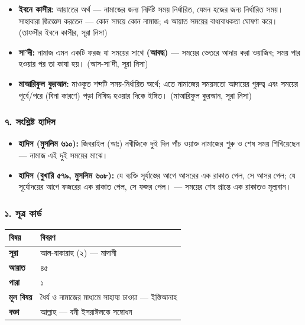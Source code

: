 \begin{itemize}
\item \textbf{ইবনে কাসীর:} আয়াতের অর্থ — নামাজের জন্য নির্দিষ্ট সময় নির্ধারিত, যেমন হজের জন্য নির্ধারিত সময়। সাহাবারা জিজ্ঞেস করতেন — কোন সময়ে কোন নামাজ; এ আয়াত সময়ের বাধ্যবাধকতা ঘোষণা করে। (তাফসীর ইবনে কাসীর, সূরা নিসা)
\item \textbf{সা'দী:} নামাজ এমন একটি ফরজ যা সময়ের সাথে \textbf{ (আবদ্ধ)} — সময়ের ভেতরে আদায় করা ওয়াজিব; সময় পার হওয়ার পর তা কাযা হয়। (আস-সা'দী, সূরা নিসা)
\item \textbf{মাআরিফুল কুরআন:} মাওকূত শব্দটি সময়-নির্ধারিত অর্থে; এতে নামাজের সময়মতো আদায়ের গুরুত্ব এবং সময়ের পূর্বে/পরে (বিনা কারণে) পড়া নিষিদ্ধ হওয়ার দিকে ইঙ্গিত। (মাআরিফুল কুরআন, সূরা নিসা)
\end{itemize}
\subsubsection*{৭. সংশ্লিষ্ট হাদিস}

\begin{itemize}
\item \textbf{হাদিস (মুসলিম ৬১০):} জিবরাইল (আঃ) নবীজিকে দুই দিন পাঁচ ওয়াক্ত নামাজের শুরু ও শেষ সময় শিখিয়েছেন — নামাজ এই দুই সময়ের মাঝে।
\item \textbf{হাদিস (বুখারি ৫৭৯, মুসলিম ৬০৮):} যে ব্যক্তি সূর্যাস্তের আগে আসরের এক রাকাত পেল, সে আসর পেল; যে সূর্যোদয়ের আগে ফজরের এক রাকাত পেল, সে ফজর পেল। — সময়ের শেষ প্রান্তে এক রাকাতও মূল্যবান।
\end{itemize}
\subsubsection*{১. সূত্র কার্ড}

\begin{table}[h]\centering\small
\begin{tabular}{ll}
বিষয় & বিবরণ \\
\hline
\textbf{সূরা} & আল-বাকারাহ (২) — মাদানী \\
\textbf{আয়াত} & ৪৫ \\
\textbf{পারা} & ১ \\
\textbf{মূল বিষয়} & ধৈর্য ও নামাজের মাধ্যমে সাহায্য চাওয়া — ইস্তিআনাহ \\
\textbf{বক্তা} & আল্লাহ — বনী ইসরাঈলকে সম্বোধন \\
\hline
\end{tabular}
\end{table}

